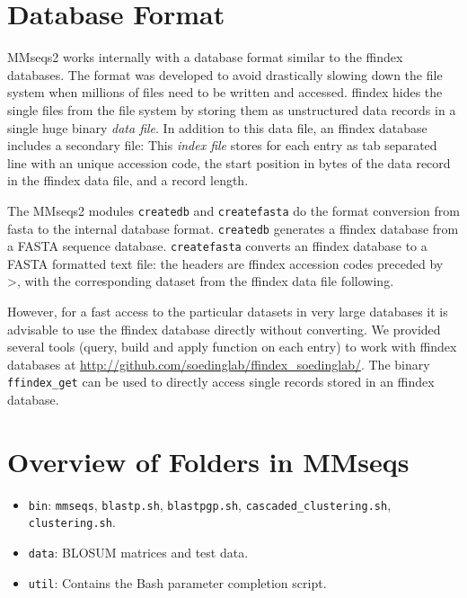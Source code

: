 \documentclass[11pt,a4paper]{scrreprt}
\begin{document}
\section{Database Format}
MMseqs2 works internally with a database format similar to the ffindex databases. The format was developed to avoid drastically slowing down the file system when millions of files need to be written and accessed. ffindex hides the single files from the file system by storing them as unstructured data records in a single huge binary \emph{data file}. In addition to this data file, an ffindex database includes a secondary file: This \emph{index file} stores for each entry as tab separated line with an unique accession code, the start position in bytes of the data record in the ffindex data file, and a record length.


The MMseqs2 modules \texttt{createdb} and \texttt{createfasta} do the format conversion from fasta to the internal database format. 
\texttt{createdb} generates a ffindex database from a FASTA sequence database. 
\texttt{createfasta} converts an ffindex database to a FASTA formatted text file: the headers are ffindex accession codes preceded by \textgreater, with the corresponding dataset from the ffindex data file following.

However, for a fast access to the particular datasets in very large databases it is advisable to use the ffindex database directly without converting. We provided several tools (query, build and apply function on each entry) to work with ffindex databases at \url{http://github.com/soedinglab/ffindex_soedinglab/}. The binary \texttt{ffindex\_get} can be used to directly access single records stored in an ffindex database.
\section{Overview of Folders in MMseqs}
\begin{itemize}
\item \texttt{bin}: \texttt{mmseqs}, \texttt{blastp.sh}, \texttt{blastpgp.sh}, \texttt{cascaded\_clustering.sh}, \texttt{clustering.sh}.
\item \texttt{data}: BLOSUM matrices and test data.
\item \texttt{util}: Contains the Bash parameter completion script.
\end{itemize}
\end{document}
